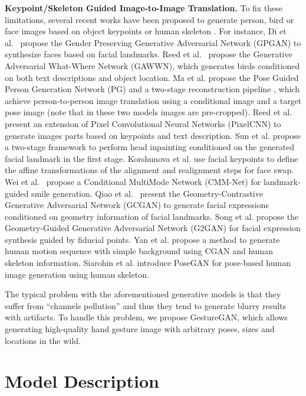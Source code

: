 \documentclass[sigconf]{acmart}
\begin{document}
\noindent\textbf{Keypoint/Skeleton Guided Image-to-Image Translation.}
To fix these limitations, several recent works have been proposed to generate person, bird or face images based on object keypoints \cite{reed2016learning,ma2017pose} or human skeleton \cite{yan2017skeleton,siarohin2017deformable}.
For instance,
Di et al.~\cite{di2017gp} propose the Gender Preserving Generative Adversarial Network (GPGAN) to synthesize faces based on facial landmarks.
Reed et al.~\cite{reed2016learning} propose the Generative Adversarial What-Where Network (GAWWN), which generates birds conditioned on both text descriptions and object location.
Ma et al. propose the Pose Guided Person Generation Network (PG) \cite{ma2017pose} and a two-stage reconstruction pipeline \cite{ma2017disentangled}, which achieve person-to-person image translation using a conditional image and a target pose image (note that in these two models images are pre-cropped).
Reed et al. \cite{reed2016generating} present an extension of Pixel Convolutional Neural Networks (PixelCNN) to generate images parts based on keypoints and text description.
Sun et al. \cite{sun2017natural} propose a two-stage framework to  perform head inpainting conditioned on the generated facial landmark in the first stage.
Korshunova et al. \cite{korshunova2016fast} use facial keypoints to define the affine transformations of the alignment and realignment steps for face swap. 
Wei et al.~\cite{wei2017every} propose a Conditional MultiMode Network (CMM-Net) for landmark-guided  smile generation.
Qiao et al.~\cite{qiao2018geometry} present the Geometry-Contrastive Generative Adversarial Network (GCGAN) to generate facial expressions conditioned on geometry information of facial landmarks. 
Song et al. \cite{song2017geometry} propose the Geometry-Guided Generative Adversarial Network (G2GAN) for facial expression synthesis guided by fiducial points.
Yan et al. \cite{yan2017skeleton} propose a method to generate human motion sequence with simple background using CGAN and human skeleton information.
Siarohin et al. \cite{siarohin2017deformable} introduce PoseGAN for pose-based human image generation using human skeleton.

The typical problem with the aforementioned generative models is that they suffer from ``channels pollution'' and thus
they tend to generate blurry results with artifacts.
To handle this problem, we propose GestureGAN, which allows generating high-quality hand gesture image with arbitrary poses, sizes and locations in the wild.

\section{Model Description}
\label{sec:method}
\end{document}
